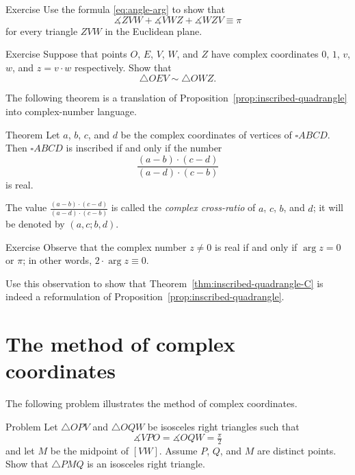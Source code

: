 \begin{thm}{Exercise}\label{ex:3-sum-C}
Use the formula \ref{eq:angle-arg} to show that  
$$\measuredangle ZVW+\measuredangle VWZ+\measuredangle WZV\equiv \pi$$
for every triangle $ZVW$ in the Euclidean plane.
\end{thm}

\begin{thm}{Exercise}\label{ex:C-sim}
Suppose that points $O$, $E$, $V$, $W$, and $Z$ have complex coordinates $0$, $1$, $v$, $w$, and $z=v\cdot w$ respectively.
Show that 
\[\triangle OEV\sim \triangle OWZ.\]

\end{thm}

The following theorem is a translation of Proposition~\ref{prop:inscribed-quadrangle} into complex-number language.

\begin{thm}{Theorem}\label{thm:inscribed-quadrangle-C}
Let $a$, $b$, $c$, and $d$ be the complex coordinates of vertices of $\square ABCD$.
Then $\square ABCD$ is inscribed
if and only if the number
$$\frac{(a-b)\cdot(c-d)}{(a-d)\cdot(c-b)}$$
is real.
\end{thm}

The value $\frac{(a-b)\cdot(c-d)}{(a-d)\cdot(c-b)}$ is called the
\emph{complex cross-ratio} of $a$, $c$, $b$, and $d$;
it will be denoted by $(a,c;b,d)$.



\begin{thm}{Exercise}\label{ex:real-cross-ratio}
Observe that the complex number $z\ne 0$ is real if and only if $\arg z=0$ or $\pi$;
in other words, $2\cdot\arg z\equiv 0$.

Use this observation to show that Theorem~\ref{thm:inscribed-quadrangle-C}
is indeed a reformulation of Proposition~\ref{prop:inscribed-quadrangle}.
\end{thm}

\section{The method of complex coordinates}

The following problem illustrates the method of complex coordinates.

\begin{thm}{Problem}\label{prob:2right-tringles}
Let $\triangle OPV$ and $\triangle OQW$ be isosceles right triangles such that 
\[\measuredangle VPO=\measuredangle OQW=\tfrac\pi2\] 
and let $M$ be the midpoint of $[VW]$.
Assume $P$, $Q$, and $M$ are distinct points.
Show that  $\triangle PMQ$ is an isosceles right triangle.
\end{thm}


